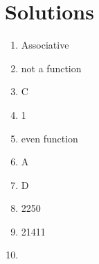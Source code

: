\documentclass[../uilmath.tex]{subfiles}
\begin{document}
\section*{Solutions}
\begin{enumerate}[label=\bfseries\arabic*.]
    \item %
    Associative 

    \item %
    not a function 

    \item %
    C 

    \item %
    1 

    \item %
    even function 

    \item %
    A 

    \item %
    D 

    \item %
    2250

    \item %
    21411

    \item %
    
\end{enumerate}
\end{document}

